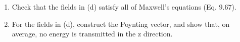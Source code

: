 \documentclass[fleqn]{article}
\begin{document}
\begin{enumerate}
\begin{enumerate}
      \item Check that the fields in (d) satisfy all of Maxwell’s equations (Eq. $9.67$).
      


      \item For the fields in (d), construct the Poynting vector, and show that, on average, no energy is transmitted in the z direction.
      

    \end{enumerate}

  \end{enumerate}
\end{document}
